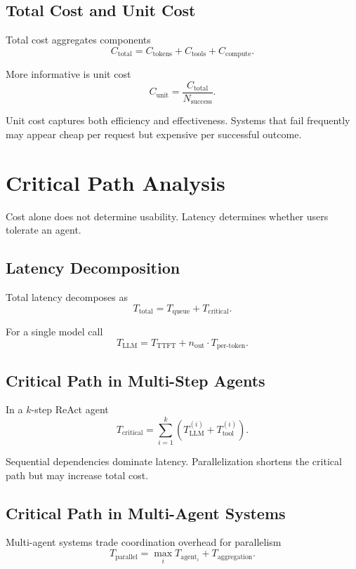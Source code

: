 \subsection{Total Cost and Unit Cost}

Total cost aggregates components
\[
C_{\text{total}} = C_{\text{tokens}} + C_{\text{tools}} + C_{\text{compute}}.
\]

More informative is unit cost
\[
C_{\text{unit}} = \frac{C_{\text{total}}}{N_{\text{success}}}.
\]

Unit cost captures both efficiency and effectiveness. Systems that fail frequently may appear cheap per request but expensive per successful outcome.

\section{Critical Path Analysis}

Cost alone does not determine usability. Latency determines whether users tolerate an agent.

\subsection{Latency Decomposition}

Total latency decomposes as
\[
T_{\text{total}} = T_{\text{queue}} + T_{\text{critical}}.
\]

For a single model call
\[
T_{\text{LLM}} = T_{\text{TTFT}} + n_{\text{out}} \cdot T_{\text{per-token}}.
\]

\subsection{Critical Path in Multi-Step Agents}

In a $k$-step ReAct agent
\[
T_{\text{critical}} =
\sum_{i=1}^{k}
\left(
T_{\text{LLM}}^{(i)} + T_{\text{tool}}^{(i)}
\right).
\]

Sequential dependencies dominate latency. Parallelization shortens the critical path but may increase total cost.

\subsection{Critical Path in Multi-Agent Systems}

Multi-agent systems trade coordination overhead for parallelism
\[
T_{\text{parallel}} =
\max_i T_{\text{agent}_i} + T_{\text{aggregation}}.
\]

